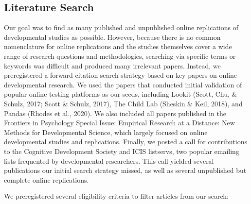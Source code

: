 \documentclass[
  man,floatsintext]{apa6}
\begin{document}
\hypertarget{literature-search}{%
\subsection{Literature Search}\label{literature-search}}

Our goal was to find as many published and unpublished online replications of developmental studies as possible. However, because there is no common nomenclature for online replications and the studies themselves cover a wide range of research questions and methodologies, searching via specific terms or keywords was difficult and produced many irrelevant papers. Instead, we preregistered a forward citation search strategy based on key papers on online developmental research. We used the papers that conducted initial validation of popular online testing platforms as our seeds, including Lookit (Scott, Chu, \& Schulz, 2017; Scott \& Schulz, 2017), The Child Lab (Sheskin \& Keil, 2018), and Pandas (Rhodes et al., 2020). We also included all papers published in the Frontiers in Psychology Special Issue: Empirical Research at a Distance: New Methods for Developmental Science, which largely focused on online developmental studies and replications. Finally, we posted a call for contributions to the Cognitive Development Society and ICIS listservs, two popular emailing lists frequented by developmental researchers. This call yielded several publications our initial search strategy missed, as well as several unpublished but complete online replications.

We preregistered several eligibility criteria to filter articles from our search:
\end{document}
